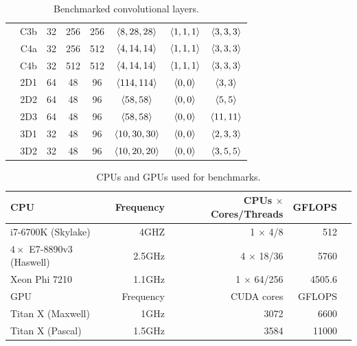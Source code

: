 \begin{table}
\begin{tabular}{cr !{\vrule width0.8pt} cccccc  }
      & C3b & 32  & 256 &  256 & $\langle8,28,28\rangle$ & $\langle1,1,1\rangle$ & $\langle3,3,3\rangle$ \\
      & C4a & 32  & 256 &  512 & $\langle4,14,14\rangle$ & $\langle1,1,1\rangle$ & $\langle3,3,3\rangle$ \\
      & C4b & 32  & 512 &  512 & $\langle4,14,14\rangle$ & $\langle1,1,1\rangle$ & $\langle3,3,3\rangle$ \\
      \hline
      & 2D1 & 64  & 48 &  96 & $\langle114,114\rangle$ & $\langle0,0\rangle$ & $\langle3,3\rangle$ \\
      & 2D2 & 64  & 48 &  96 & $\langle58,58\rangle$ & $\langle0,0\rangle$ & $\langle5,5\rangle$ \\
      & 2D3 & 64  & 48 &  96 & $\langle58,58\rangle$ & $\langle0,0\rangle$ & $\langle11,11\rangle$ \\
      & 3D1 & 32  & 48 &  96 & $\langle10,30,30\rangle$ & $\langle0,0\rangle$ & $\langle2,3,3\rangle$ \\
      & 3D2 & 32  & 48 &  96 & $\langle10,20,20\rangle$ & $\langle0,0\rangle$ & $\langle3,5,5\rangle$ \\
      \hline
    \end{tabular}
    \caption{Benchmarked convolutional layers.}
    \label{table:layers}
  \end{table}

  \begin{table}
    \begin{center}
      \setlength\tabcolsep{2.5pt}
      \begin{tabular}{lrrrr}
        \toprule
        CPU & Frequency & CPUs $\times$ Cores/Threads & GFLOPS\\
        \midrule
        i7-6700K (Skylake) & 4GHZ & 1 $\times$ 4/8 & 512\\
        $4\times$ E7-8890v3 (Haswell) & 2.5GHz & 4 $\times$ 18/36 & 5760\\
        Xeon Phi 7210 & 1.1GHz & 1 $\times$ 64/256 & 4505.6\\
        \toprule
        GPU & Frequency & CUDA cores & GFLOPS\\
        \midrule
        Titan X (Maxwell) & 1GHz & 3072 & 6600\\
        Titan X (Pascal) & 1.5GHz & 3584  &  11000\\
        \bottomrule
      \end{tabular}
    \end{center}
    \caption{CPUs and GPUs used for benchmarks.}
    \label{table:cpus}
  \end{table}

